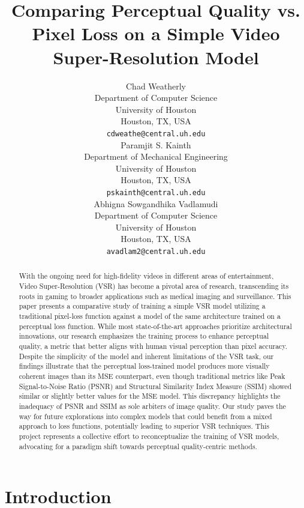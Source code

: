 \documentclass{article}
\title{Comparing Perceptual Quality vs. Pixel Loss on a Simple Video Super-Resolution Model}
\author{
  Chad Weatherly \\
  Department of Computer Science \\
  University of Houston \\
  Houston, TX, USA \\
  \texttt{cdweathe@central.uh.edu} \\
  \And
  Paramjit S. Kainth \\
  Department of Mechanical Engineering \\
  University of Houston \\
  Houston, TX, USA \\
  \texttt{pskainth@central.uh.edu} \\
  \And
  Abhigna Sowgandhika Vadlamudi \\
  Department of Computer Science \\
  University of Houston \\
  Houston, TX, USA \\
  \texttt{avadlam2@central.uh.edu} \\
}
\begin{document}
\maketitle

\begin{abstract}
 With the ongoing need for high-fidelity videos in different areas of entertainment, Video Super-Resolution (VSR) has become a pivotal area of research, transcending its roots in gaming to broader applications such as medical imaging and surveillance. This paper presents a comparative study of training a simple VSR model utilizing a traditional pixel-loss function against a model of the same architecture trained on a perceptual loss function. While most state-of-the-art approaches prioritize architectural innovations, our research emphasizes the training process to enhance perceptual quality, a metric that better aligns with human visual perception than pixel accuracy. Despite the simplicity of the model and inherent limitations of the VSR task, our findings illustrate that the perceptual loss-trained model produces more visually coherent images than its MSE counterpart, even though traditional metrics like Peak Signal-to-Noise Ratio (PSNR) and Structural Similarity Index Measure (SSIM) showed similar or slightly better values for the MSE model. This discrepancy highlights the inadequacy of PSNR and SSIM as sole arbiters of image quality. Our study paves the way for future explorations into complex models that could benefit from a mixed approach to loss functions, potentially leading to superior VSR techniques. This project represents a collective effort to reconceptualize the training of VSR models, advocating for a paradigm shift towards perceptual quality-centric methods.
\end{abstract}

\section{Introduction}
\end{document}
